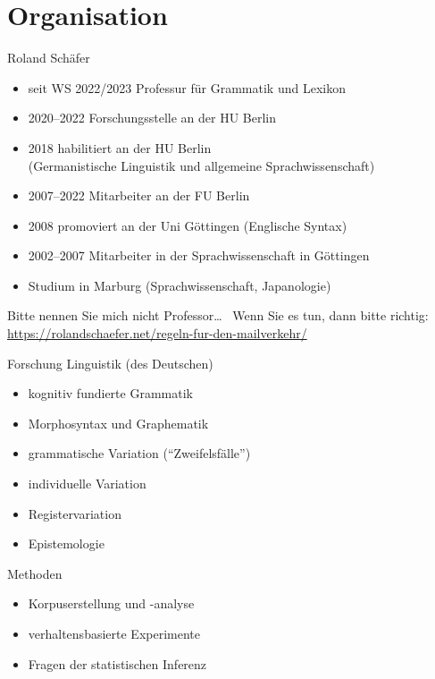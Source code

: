 
\section{Organisation}

\begin{frame}
  {Roland Schäfer}
  \onslide<+->
  \begin{itemize}[<+->]
    \item seit WS 2022\slash 2023 Professur für Grammatik und Lexikon
    \item 2020--2022 Forschungsstelle an der HU Berlin
    \item 2018 habilitiert an der HU Berlin\\
      (Germanistische Linguistik und allgemeine Sprachwissenschaft)
    \item 2007--2022 Mitarbeiter an der FU Berlin
    \item 2008 promoviert an der Uni Göttingen (Englische Syntax)
    \item 2002--2007 Mitarbeiter in der Sprachwissenschaft in Göttingen
    \item Studium in Marburg (Sprachwissenschaft, Japanologie)
  \end{itemize}
  \Zeile
  \onslide<+->
  Bitte nennen Sie mich nicht Professor\ldots\ \onslide<+-> Wenn Sie es tun, dann bitte richtig:\\
  \url{https://rolandschaefer.net/regeln-fur-den-mailverkehr/}
\end{frame}

\begin{frame}
  {Forschung}
  \onslide<+->
  \onslide<+->
  Linguistik (des Deutschen)\\
  \Halbzeile
  \begin{itemize}[<+->]
    \item kognitiv fundierte Grammatik
    \item Morphosyntax und Graphematik
    \item grammatische Variation ("`Zweifelsfälle"')
    \item individuelle Variation
    \item Registervariation
    \item Epistemologie
  \end{itemize}
  \Zeile
  \onslide<+->
  Methoden\\
  \Halbzeile
  \begin{itemize}[<+->]
    \item Korpuserstellung und -analyse
    \item verhaltensbasierte Experimente
    \item Fragen der statistischen Inferenz
  \end{itemize}
\end{frame}

